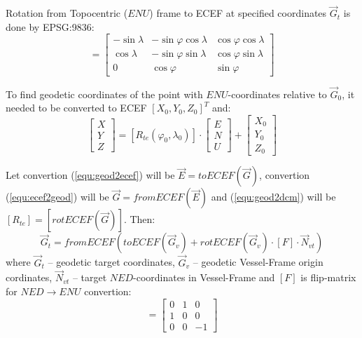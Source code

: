 \documentclass[10pt,letterpaper]{article}
\numberwithin{equation}{section}
\numberwithin{figure}{section}
\numberwithin{table}{section}
\begin{document}
Rotation from Topocentric ($ENU$) frame to ECEF at specified coordinates $\vec{G}_{t}$
is done by EPSG:9836:
\begin{equation}
    [R_{te}(\varphi, \lambda)] = \begin{bmatrix}
        -\sin \lambda & -\sin \varphi \cos \lambda & \cos \varphi \cos \lambda \\
         \cos \lambda & -\sin \varphi \sin \lambda & \cos \varphi \sin \lambda \\
         0            &  \cos \varphi              & \sin \varphi
    \end{bmatrix}
    \label{equ:geod2dcm}
\end{equation}

To find geodetic coordinates of the point with $ENU$-coordinates relative to
$\vec{G}_0$, it needed to be converted to ECEF $[ X_0, Y_0, Z_0 ]^{T}$ and:
\begin{equation}
    \begin{bmatrix}
        X \\ Y \\ Z
    \end{bmatrix} = [R_{te}(\varphi_0, \lambda_0)] \cdot \begin{bmatrix}
        E \\ N \\ U
    \end{bmatrix} + \begin{bmatrix}
        X_0 \\ Y_0 \\ Z_0
    \end{bmatrix}
\end{equation}

Let convertion (\ref{equ:geod2ecef}) will be $\vec{E} = toECEF(\vec{G})$,  convertion
(\ref{equ:ecef2geod}) will be $\vec{G} = fromECEF(\vec{E})$ and (\ref{equ:geod2dcm}) will
be $[R_{te}] = [rotECEF(\vec{G})]$. Then:
\begin{equation}
    \vec{G}_{t} = fromECEF(toECEF(\vec{G}_{v}) + rotECEF(\vec{G}_{v}) \cdot [F] \cdot \vec{N}_{vt})
\end{equation}
where $\vec{G}_{t}$ -- geodetic target coordinates, $\vec{G}_{v}$ -- geodetic Vessel-Frame
origin cordinates, $\vec{N}_{vt}$ -- target $NED$-coordinates in Vessel-Frame and $[F]$ is
flip-matrix for $NED \rightarrow ENU$ convertion:
\begin{equation}
    [F] = \begin{bmatrix}
        0 & 1 & 0 \\ 1 & 0 & 0 \\ 0 & 0 & -1
    \end{bmatrix}
\end{equation}

%
%
%
\end{document}
